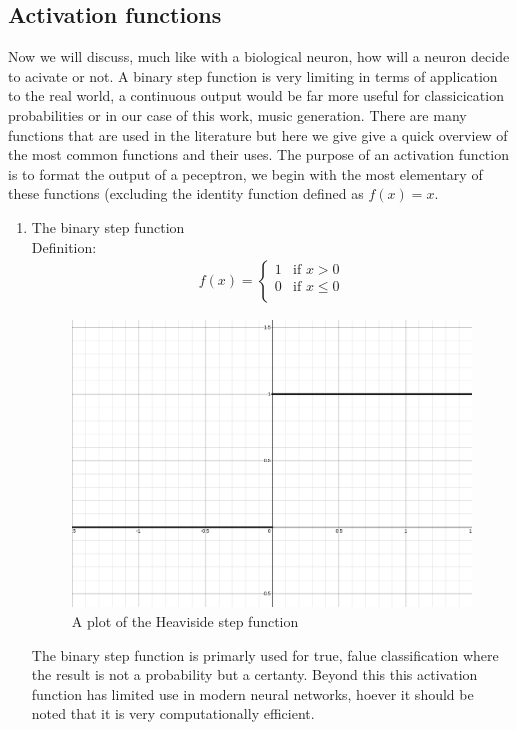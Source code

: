 \documentclass{article}
\begin{document}
\subsection{Activation functions}
\label{sec:activationfuncs}
Now we will discuss, much like with a biological neuron, how will a neuron decide to acivate or not. A binary step function is very limiting in terms of application to the real world, a continuous output would be far more useful for classicication probabilities or in our case of this work, music generation. There are many functions that are used in the literature but here we give give a quick overview of the most common functions and their uses. The purpose of an activation function is to format the output of a peceptron, we begin with the most elementary of these functions (excluding the identity function defined as $f(x) = x$. 
\begin{enumerate}
\item The binary step function \\
Definition:
\begin{align*}
f(x) = 
\begin{cases}
 1 & \text{if } x > 0 \\
 0 & \text{if } x \leq 0 \\
\end{cases}
\end{align*}
\begin{figure}[H]
\centering
\caption{A plot of the Heaviside step function}
\includegraphics[scale=0.2]{heaviside.png}
\end{figure}
The binary step function is primarly used for true, falue classification where the result is not a probability but a certanty. Beyond this this activation function has limited use in modern neural networks, hoever it should be noted that it is very computationally efficient. 

\end{enumerate}
\end{document}
